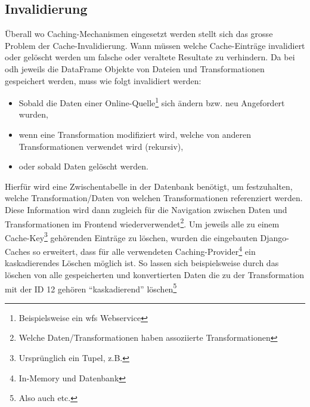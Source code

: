 \subsection{Invalidierung}

Überall wo Caching-Mechanismen eingesetzt werden stellt sich das grosse Problem der Cache-Invalidierung. Wann müssen welche Cache-Einträge invalidiert oder gelöscht werden um falsche oder veraltete Resultate zu verhindern. Da bei \gls{odh} jeweils die DataFrame Objekte von Dateien und Transformationen gespeichert werden, muss wie folgt invalidiert werden:

\begin{itemize}
	\item Sobald die Daten einer Online-Quelle\footnote{Beispielsweise ein \acs{wfs} Webservice} sich ändern bzw. neu Angefordert wurden,
	\item wenn eine Transformation modifiziert wird, welche von anderen Transformationen verwendet wird (rekursiv),
	\item oder sobald Daten gelöscht werden.
\end{itemize}

Hierfür wird eine Zwischentabelle in der Datenbank benötigt, um festzuhalten, welche Transformation/Daten von welchen Transformationen referenziert werden. Diese Information wird dann zugleich für die Navigation zwischen Daten und Transformationen im Frontend wiederverwendet\footnote{Welche Daten/Transformationen haben assoziierte Transformationen}. Um jeweils alle zu einem Cache-Key\footnote{Ursprünglich ein Tupel, z.B. } gehörenden Einträge zu löschen, wurden die eingebauten Django-Caches so erweitert, dass für alle verwendeten Caching-Provider\footnote{In-Memory und Datenbank} ein kaskadierendes Löschen möglich ist. So lassen sich beispielsweise durch das löschen von  alle gespeicherten und konvertierten Daten die zu der Transformation mit der ID 12 gehören ``kaskadierend'' löschen\footnote{Also auch  etc.}
